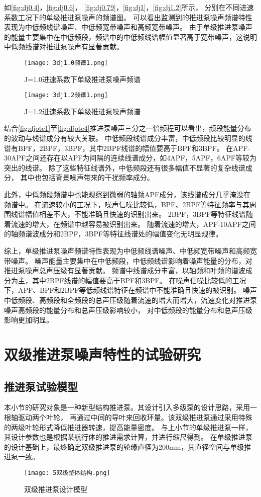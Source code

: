 如\autoref{fig:dj0.4}，\autoref{fig:dj0.6}，
\autoref{fig:dj0.79}，\autoref{fig:dj1}，\autoref{fig:dj1.2}所示，
分别在不同进速系数工况下的单级推进泵噪声的频谱图。
可以看出监测到的推进泵噪声频谱特性表现为中低频线谱噪声、中低频宽带噪声和高频宽带噪声。
由于单级推进泵噪声的能量主要集中在中低频段，频谱中的中低频线谱幅值显著高于宽带噪声，这说明中低频线谱对推进泵噪声有显著贡献。
\begin{figure}[htbp]
    \centering
    \texttt{[image: 3dj1.0频谱1.png]}
    \caption{\label{fig:dj1}J=1.0进速系数下单级推进泵噪声频谱}
\end{figure}
\begin{figure}[htbp]
    \centering
    \texttt{[image: 3dj1.2频谱1.png]}
    \caption{\label{fig:dj1.2}J=1.2进速系数下单级推进泵噪声频谱}
\end{figure}

结合\autoref{fig:djotc1}至\autoref{fig:djotc4}推进泵噪声三分之一倍频程可以看出，频段能量分布的波动与线谱成分有较大关联。
中低频段线谱成分丰富，中低频段比较明显的线谱有BPF，2BPF，3BPF，其中2BPF线谱的幅值要高于BPF和3BPF。
在APF-30APF之间还存在以APF为间隔的连续线谱成分，如4APF，5APF，6APF等较为突出的线谱。
除了这些特征线谱外，中低频段还有很多幅值不显著的复杂线谱成分，
其中也包括背景噪声带来的干扰频率成分。

此外，中低频段频谱中也能观察到微弱的轴频APF成分，该线谱成分几乎淹没在频谱中。
在流速较小的工况下，噪声信噪比较低，BPF、2BPF等特征频率与其周围线谱幅值相差不大，不能准确且快速的识别出来。
2BPF，3BPF等特征线谱随着流速的增大，在频谱中越容易被识别出来。
随着流速的增大，APF-10APF之间的轴频谐波成分和2BPF，3BPF等特征线谱处的幅值变化无明显规律。

综上，单级推进泵噪声频谱特性表现为中低频线谱噪声、中低频宽带噪声和高频宽带噪声。
噪声能量主要集中在中低频段，中低频线谱影响着噪声能量的分布，对推进泵噪声总声压级有显著贡献。
频谱中线谱成分丰富，以轴频和叶频的谐波成分为主，其中2BPF线谱的幅值要高于BPF和3BPF。
在噪声信噪比较低的工况下，APF、BPF和2BPF等低频线谱特征在频谱中不能准确且快速的被识别。
噪声中低频段、高频段和全频段的总声压级随着流速的增大而增大，流速变化对推进泵噪声高频段的能量分布和总声压级影响较小，
对中低频段的能量分布和总声压级影响更加明显。

\section{双级推进泵噪声特性的试验研究}
\subsection{推进泵试验模型}
本小节的研究对象是一种新型结构推进泵。其设计引入多级泵的设计思路，采用一根轴驱动两个叶轮，
再通过中间的导叶来回收环量。该双级推进泵通过采用特殊的两级叶轮形式降低推进器转速，提高能量密度。
与上小节的单级推进泵一样，其设计参数也是根据某航行体的推进需求计算，并进行缩尺得到。
在单级推进泵的设计基础上，最终确定双级推进泵的轮缘直径为200mm，其直径空间与单级推进泵一致。
\begin{figure}[htbp]
    \centering
    \texttt{[image: 5双级整体结构.png]}
    \caption{\label{fig:sj_modle}双级推进泵设计模型}
\end{figure}

